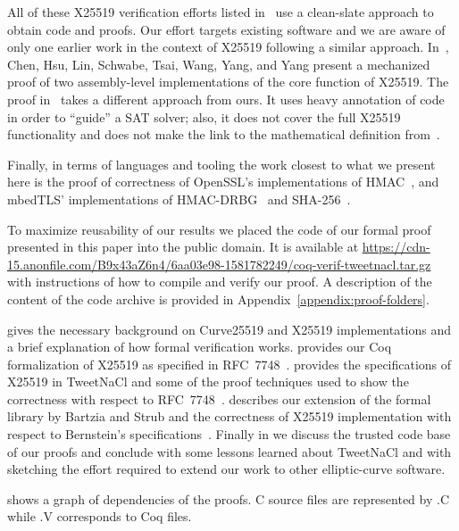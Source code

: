 All of these X25519 verification efforts listed in~\cite{BBB+19} use a clean-slate
approach to obtain code and proofs.
Our effort targets existing software and we are aware of only one earlier
work in the context of X25519 following a similar approach.
In~\cite{Chen2014VerifyingCS}, Chen, Hsu, Lin, Schwabe, Tsai, Wang, Yang, and Yang present
a mechanized proof of two assembly-level implementations of the core function of X25519.
The proof in~\cite{Chen2014VerifyingCS} takes a different approach from ours.
It uses heavy annotation of code in order to ``guide'' a SAT solver;
also, it does not cover the full X25519 functionality and does
not make the link to the mathematical definition from~\cite{Ber06}.

Finally, in terms of languages and tooling the work closest to what we present here
is the proof of correctness of OpenSSL's
implementations of HMAC~\cite{Beringer2015VerifiedCA},
and mbedTLS' implementations of
HMAC-DRBG~\cite{2017-Ye} and SHA-256~\cite{2015-Appel}.

To maximize reusability of our results we placed the code of our formal proof
presented in this paper into the public domain.
It is available at \url{https://cdn-15.anonfile.com/B9x43aZ6n4/6aa03e98-1581782249/coq-verif-tweetnacl.tar.gz}
with instructions of how to compile and verify our proof.
A description of the content of the code archive is provided in
Appendix~\ref{appendix:proof-folders}.

 gives the necessary background on Curve25519 and X25519
implementations and a brief explanation of how formal verification works.
 provides our Coq formalization of X25519 as specified in RFC~7748~\cite{rfc7748}.
 provides the specifications of X25519 in TweetNaCl and some of the
proof techniques used to show the correctness with respect to RFC~7748~\cite{rfc7748}.
 describes our extension of the formal library by Bartzia
and Strub and the correctness of X25519 implementation with respect to Bernstein's
specifications~\cite{Ber14}.
Finally in  we discuss the trusted code base of our proofs
and conclude with some lessons learned about TweetNaCl and with sketching the
effort required to extend our work to other elliptic-curve software.

 shows a graph of dependencies of the proofs.
C source files are represented by {\color{doc@lstfunctions}.C} while
{\color{doc@lstfunctions}.V} corresponds to Coq files.

